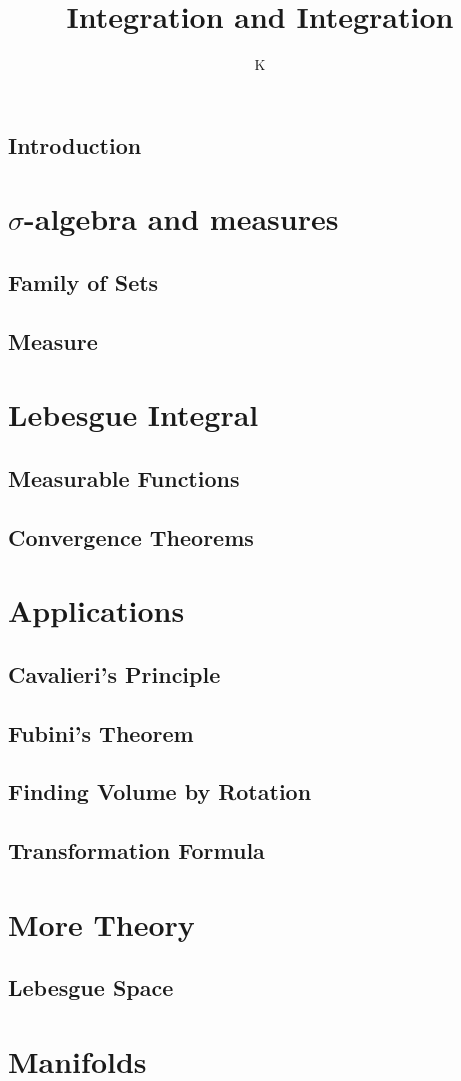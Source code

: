 \documentclass[a4paper]{book}
\title{Integration and Integration}
\author{K}
\theoremstyle{definition}
\begin{document}
\maketitle
\tableofcontents
%
%
%
%
%
\chapter*{Introduction}

%
%
%
%
%
\part{\(\sigma\)-algebra and measures}
%
\chapter{Family of Sets}

%
\chapter{Measure}

%
%
%
%
%
\part{Lebesgue Integral}
\chapter{Measurable Functions}

\chapter{Convergence Theorems}

%
%
%
%
%
\part{Applications}
\chapter{Cavalieri's Principle}

%
\chapter{Fubini's Theorem}

%
\chapter{Finding Volume by Rotation}

%
\chapter{Transformation Formula}

%
%
%
%
%
\part{More Theory}
\chapter{Lebesgue Space}

%
%
%
%
%
\part{Manifolds}

\end{document}
